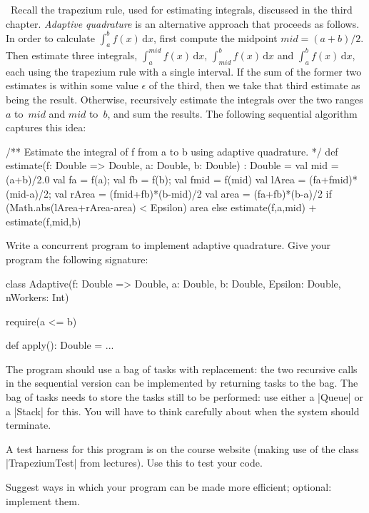 \begin{question}
\def\integral#1#2{\int_{#1}^{#2} f(x)\,\mbox{d}x} 
%
\Programming\ Recall the trapezium rule, used for estimating integrals,
discussed in the third chapter.  \emph{Adaptive quadrature} is an
alternative approach that proceeds as follows.  In order to calculate
$\integral{a}{b}$, first compute the midpoint $mid = (a+b)/2$.  Then estimate
three integrals, $\integral{a}{mid}$, $\integral{mid}{b}$ and
$\integral{a}{b}$, each using the trapezium rule with a single interval.  If
the sum of the former two estimates is within some value $\epsilon$ of the
third, then we take that third estimate as being the result.  Otherwise,
recursively estimate the integrals over the two ranges $a$ to~$mid$ and $mid$
to~$b$, and sum the results.  The following sequential algorithm captures this
idea:
%
\begin{scala}
  /** Estimate the integral of f from a to b using adaptive quadrature. */
  def estimate(f: Double => Double, a: Double, b: Double) : Double = {
    val mid = (a+b)/2.0
    val fa = f(a); val fb = f(b); val fmid = f(mid)
    val lArea = (fa+fmid)*(mid-a)/2; val rArea = (fmid+fb)*(b-mid)/2
    val area = (fa+fb)*(b-a)/2
    if (Math.abs(lArea+rArea-area) < Epsilon) area
    else estimate(f,a,mid) + estimate(f,mid,b)
  }
\end{scala}

Write a concurrent program to implement adaptive quadrature.  Give your
program the following signature:
\begin{scala}
class Adaptive(f: Double => Double, a: Double, b: Double, Epsilon: Double, nWorkers: Int){
  require(a <= b)

  def apply(): Double = ...
}
\end{scala}
%
The program should use a bag of tasks with replacement: the two recursive
calls in the sequential version can be implemented by returning tasks to the
bag.  The bag of tasks needs to store the tasks still to be performed: use
either a |Queue| or a |Stack| for this.  You will have to think carefully
about when the system should terminate.

A test harness for this program is on the course website (making use of the
class |TrapeziumTest| from lectures).  Use this to test your code. 

Suggest ways in which your program can be made more efficient; optional:
implement them.
\end{question}

